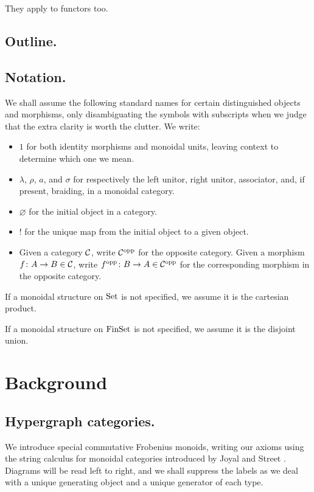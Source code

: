 They apply to functors too.


\subsection{Outline.}
\subsection{Notation.}
We shall assume the following standard names for certain distinguished objects
and morphisms, only disambiguating the symbols with subscripts when we judge
that the extra clarity is worth the clutter. We write: 
\begin{itemize} 
  \item $1$ for both identity morphisms and monoidal units, leaving context to
    determine which one we mean.
  \item $\lambda$, $\rho$, $a$, and $\sigma$ for respectively the left unitor, right unitor,
    associator, and, if present, braiding, in a monoidal category.
  \item $\varnothing$ for the initial object in a category.
  \item $!$ for the unique map from the initial object to a given object.
  \item Given a category $\mathcal C$, write $\mathcal C^{\mathrm{opp}}$ for the opposite category.
    Given a morphism $f{\colon} A \to B \in \mathcal C$, write $f^{\mathrm{opp}}{\colon} B \to A \in
    \mathcal C^{\mathrm{opp}}$ for the corresponding morphism in the opposite category.
\end{itemize}

If a monoidal structure on $\mathrm{Set}$ is not specified, we assume it is the
cartesian product. 

If a monoidal structure on $\mathrm{FinSet}$ is not specified, we assume it is the
disjoint union. 

\section{Background}

\subsection{Hypergraph categories.}
We introduce special commutative Frobenius monoids, writing
our axioms using the string calculus for monoidal categories introduced by Joyal
and Street \cite{JS}. Diagrams will be read left to right, and we shall suppress
the labels as we deal with a unique generating object and a unique generator of
each type. 

